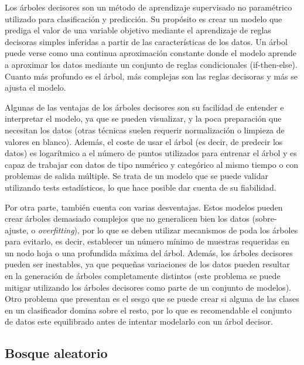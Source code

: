 
Los árboles decisores son un método de aprendizaje supervisado no paramétrico utilizado para clasificación y predicción.
Su propósito es crear un modelo que prediga el valor de una variable objetivo mediante el aprendizaje de reglas decisoras simples inferidas a partir de las características de los datos.
Un árbol puede verse como una continua aproximación constante donde el modelo aprende a aproximar los datos mediante un conjunto de reglas condicionales (if-then-else).
Cuanto más profundo es el árbol, más complejas son las reglas decisoras y más se ajusta el modelo.

Algunas de las ventajas de los árboles decisores son su facilidad de entender e interpretar el modelo, ya que se pueden visualizar, y la poca preparación que necesitan los datos (otras técnicas suelen requerir normalización o limpieza de valores en blanco).
Además, el coste de usar el árbol (es decir, de predecir los datos) es logarítmico a el número de puntos utilizados para entrenar el árbol y es capaz de trabajar con datos de tipo numérico y categórico al mismo tiempo o con problemas de salida múltiple.
Se trata de un modelo que se puede validar utilizando tests estadísticos,
lo que hace posible dar cuenta de su fiabilidad.

Por otra parte, también cuenta con varias desventajas.
Estos modelos pueden crear árboles demasiado complejos que no generalicen bien los datos (sobre-ajuste, o \emph{overfitting}), por lo que se deben utilizar mecanismos de poda los árboles para evitarlo, es decir, establecer un número mínimo de muestras requeridas en un nodo hoja o una profundida máxima del árbol.
Además, los árboles decisores pueden ser inestables, ya que pequeñas variaciones de los datos pueden resultar en la generación de árboles completamente distintos (este problema se puede mitigar utilizando los árboles decisores como parte de un conjunto de modelos).
Otro problema que presentan es el sesgo que se puede crear si alguna de las clases en un clasificador domina sobre el resto, por lo que es recomendable el conjunto de datos este equilibrado antes de intentar modelarlo con un árbol decisor.

\subsection{Bosque aleatorio}


